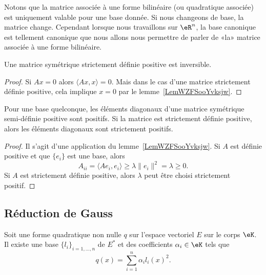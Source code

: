 \begin{normaltext}
	Notons que la matrice associée à une forme bilinéaire (ou quadratique associée) est uniquement valable pour une base donnée. Si nous changeons de base, la matrice change. Cependant lorsque nous travaillons sur \( \eR^n\), la base canonique est tellement canonique que nous allons nous permettre de parler de «la» matrice associée à une forme bilinéaire.
\end{normaltext}

\begin{corollary}
	Une matrice symétrique strictement définie positive est inversible.
\end{corollary}

\begin{proof}
	Si \( Ax=0\) alors \( \langle Ax, x\rangle =0\). Mais dans le cas d'une matrice strictement définie positive, cela implique \( x=0\) par le lemme~\ref{LemWZFSooYvksjw}.
\end{proof}

\begin{lemma}
	Pour une base quelconque, les éléments diagonaux d'une matrice symétrique semi-définie positive sont positifs. Si la matrice est strictement définie positive, alors les éléments diagonaux sont strictement positifs.
\end{lemma}

\begin{proof}
	Il s'agit d'une application du lemme~\ref{LemWZFSooYvksjw}. Si \( A\) est définie positive et que \( \{ e_i \}\) est une base, alors
	\begin{equation}
		A_{ii}=\langle Ae_i, e_i\rangle \geq \lambda\| e_i \|^2=\lambda\geq 0.
	\end{equation}
	Si \( A\) est strictement définie positive, alors \( \lambda\) peut être choisi strictement positif.
\end{proof}

\subsection{Réduction de Gauss}

\begin{theorem}     \label{THOooOMMFooKxqICS}
	Soit une forme quadratique non nulle \( q\) sur l'espace vectoriel \( E\) sur le corps \( \eK\). Il existe une base  \(\{ l_i \}_{i=1,\ldots, n}\) de \( E^*\) et des coefficients \( \alpha_i\in \eK\) tels que
	\begin{equation}
		q(x)=\sum_{i=1}^n\alpha_il_i(x)^2.
	\end{equation}
\end{theorem}

